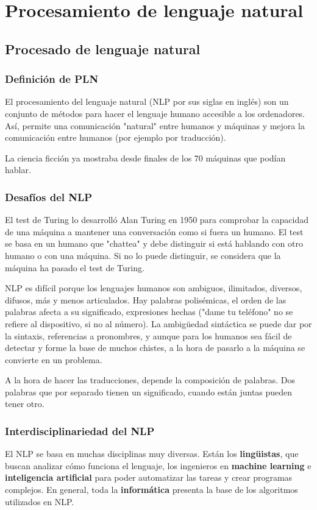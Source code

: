 \chapter{Procesamiento de lenguaje natural}
\section{Procesado de lenguaje natural}
\subsection{Definición de PLN}
El procesamiento del lenguaje natural (NLP por sus siglas en inglés) son un conjunto de métodos para hacer el lenguaje humano accesible a los ordenadores. Así, permite una comunicación "natural" entre humanos y máquinas y mejora la comunicación entre humanos (por ejemplo por traducción).

La ciencia ficción ya mostraba desde finales de los 70 máquinas que podían hablar. 

\subsection{Desafíos del NLP}
El test de Turing lo desarrolló Alan Turing en 1950 para comprobar la capacidad de una máquina a mantener una conversación como si fuera un humano. El test se basa en un humano que "chattea" y debe distinguir si está hablando con otro humano o con una máquina. Si no lo puede distinguir, se considera que la máquina ha pasado el test de Turing. 

NLP es difícil porque los lenguajes humanos son ambiguos, ilimitados, diversos, difusos, más y menos articulados. Hay palabras polisémicas, el orden de las palabras afecta a su significado, expresiones hechas ("dame tu teléfono" no se refiere al dispositivo, si no al número). La ambigüedad sintáctica se puede dar por la sintaxis, referencias a pronombres, y aunque para los humanos sea fácil de detectar y forme la base de muchos chistes, a la hora de pasarlo a la máquina se convierte en un problema. 

A la hora de hacer las traducciones, depende la composición de palabras. Dos palabras que por separado tienen un significado, cuando están juntas pueden tener otro. 

\subsection{Interdisciplinariedad del NLP}
El NLP se basa en muchas disciplinas muy diversas. Están los \textbf{lingüistas}, que buscan analizar cómo funciona el lenguaje, los ingenieros en \textbf{machine learning} e \textbf{inteligencia artificial} para poder automatizar las tareas y crear programas complejos. En general, toda la \textbf{informática} presenta la base de los algoritmos utilizados en NLP.

